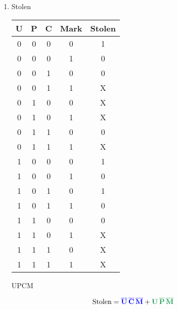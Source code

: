 \documentclass{article}
\newenvironment{solution}{\begin{mdframed}[style=SolutionFrame]}{\end{mdframed}}
\newenvironment{enum}{\begin{enumerate}[label={(\alph*)}]}{\end{enumerate}}
\begin{document}
\begin{enum}
        \newpage
        \item Stolen
            \begin{solution}
                \begin{center}
                    \begin{tabular}{c|c|c|c||c}
                        U & P & C & Mark & Stolen \\ \hline
                        0 & 0 & 0 & 0 & 1 \\ \hline
                        0 & 0 & 0 & 1 & 0 \\ \hline
                        0 & 0 & 1 & 0 & 0 \\ \hline
                        0 & 0 & 1 & 1 & X \\ \hline
                        0 & 1 & 0 & 0 & X \\ \hline
                        0 & 1 & 0 & 1 & X \\ \hline
                        0 & 1 & 1 & 0 & 0 \\ \hline
                        0 & 1 & 1 & 1 & X \\ \hline
                        1 & 0 & 0 & 0 & 1 \\ \hline
                        1 & 0 & 0 & 1 & 0 \\ \hline
                        1 & 0 & 1 & 0 & 1 \\ \hline
                        1 & 0 & 1 & 1 & 0 \\ \hline
                        1 & 1 & 0 & 0 & 0 \\ \hline
                        1 & 1 & 0 & 1 & X \\ \hline
                        1 & 1 & 1 & 0 & X \\ \hline
                        1 & 1 & 1 & 1 & X \\ \hline
                    \end{tabular}
                    \vfill
                    
                    \begin{Karnaugh4}{U}{P}{C}{M}

                    \end{Karnaugh4}
                    $$\text{Stolen}=\textcolor{blue}{\mathbf{\overline{U}\,\overline{C}\,\overline{M}}}+\textcolor{ForestGreen}{\mathbf{U\,\overline{P}\,\overline{M}}}$$
                \end{center}
            \end{solution}
    \end{enum}
\end{document}
